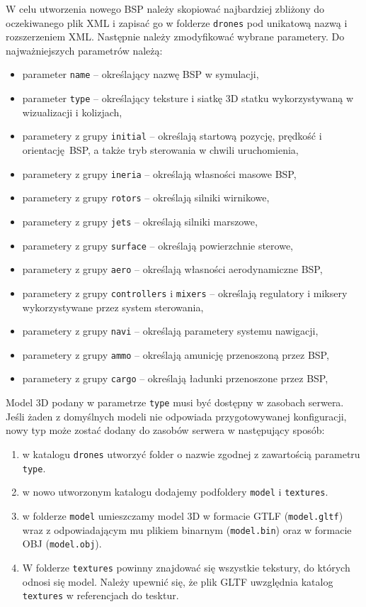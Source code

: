 \documentclass[15pt]{sprawozdanie}
\begin{document}
W celu utworzenia nowego BSP należy skopiować najbardziej zbliżony do oczekiwanego plik XML i zapisać go w folderze \texttt{drones} pod unikatową nazwą i rozszerzeniem XML. Następnie należy zmodyfikować wybrane parametery. Do najważniejszych parametrów należą:

 \begin{itemize}[noitemsep]
\item parameter \texttt{name} -- określający nazwę BSP w symulacji,
\item parameter \texttt{type} -- określający teksture i siatkę 3D statku wykorzystywaną w wizualizacji i kolizjach,
\item parametery z grupy \texttt{initial} -- określają startową pozycję, prędkość i orientację BSP, a także tryb sterowania w chwili uruchomienia,
\item parametery z grupy \texttt{ineria} -- określają własności masowe BSP,
\item parametery z grupy \texttt{rotors} -- określają silniki wirnikowe,
\item parametery z grupy \texttt{jets} -- określają silniki marszowe,
\item parametery z grupy \texttt{surface} -- określają powierzchnie sterowe,
\item parametery z grupy \texttt{aero} -- określają własności aerodynamiczne BSP,
\item parametery z grupy \texttt{controllers} i \texttt{mixers} -- określają regulatory i miksery wykorzystywane przez system sterowania,
\item parametery z grupy \texttt{navi} -- określają parametery systemu nawigacji,
\item parametery z grupy \texttt{ammo} -- określają amunicję przenoszoną przez BSP,
\item parametery z grupy \texttt{cargo} -- określają ładunki przenoszone przez BSP,
\end{itemize}

Model 3D podany w parametrze \texttt{type} musi być dostępny w zasobach serwera. Jeśli żaden z domyślnych modeli nie odpowiada przygotowywanej konfiguracji, nowy typ może zostać dodany do zasobów serwera w następujący sposób:

\begin{enumerate}
	\item w katalogu \texttt{drones} utworzyć folder o nazwie zgodnej z zawartością parametru \texttt{type}.
	\item w nowo utworzonym katalogu dodajemy podfoldery \texttt{model} i \texttt{textures}.
	\item w folderze \texttt{model} umieszczamy model 3D w formacie GTLF (\texttt{model.gltf}) wraz z odpowiadającym mu plikiem binarnym (\texttt{model.bin}) oraz w formacie OBJ (\texttt{model.obj}).
	\item W folderze \texttt{textures} powinny znajdować się wszystkie tekstury, do których odnosi się model. Należy upewnić się, że plik GLTF uwzględnia katalog \texttt{textures} w referencjach do tesktur.
\end{enumerate}
\end{document}
